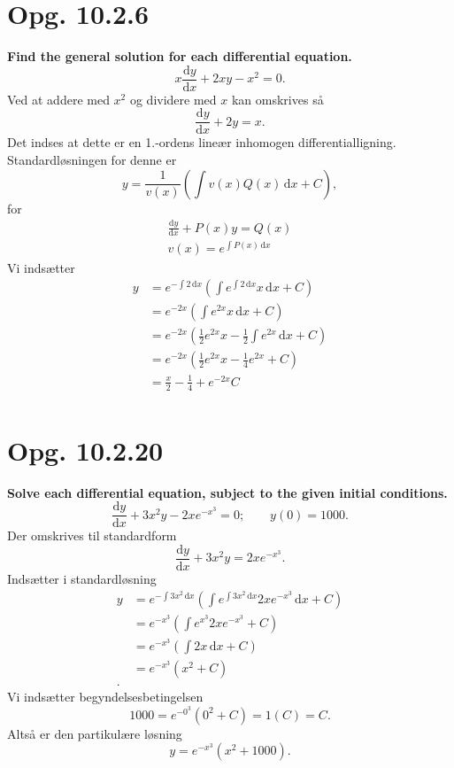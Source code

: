 \documentclass[12pt]{article}
\begin{document}
\section*{Opg. 10.2.6}
\textbf{Find the general solution for each differential equation.}
\[
x \frac{\mathrm{d}y}{\mathrm{d}x} + 2xy - x^2 = 0
.\] 
\bigbreak
Ved at addere med $x^2$ og dividere med $x$ kan omskrives så
\[
\frac{\mathrm{d}y}{\mathrm{d}x} + 2y  = x
.\] 
Det indses at dette er en 1.-ordens lineær inhomogen differentialligning. Standardløsningen for denne er
\[
  y = \frac{1}{v(x)}\left( \int v(x)Q(x) \, \mathrm{d}x + C  \right) 
,\]
for
\begin{gather*}
  \frac{\mathrm{d}y}{\mathrm{d}x} + P(x)y = Q(x) \\
v(x) = e^{\int P(x) \, \mathrm{d}x}
\end{gather*}
Vi indsætter
\begin{align*}
  y &= e^{-\int 2 \, \mathrm{d}x}\left( \int e^{\int 2 \, \mathrm{d}x}x \, \mathrm{d}x + C \right) \\
  &= e^{-2x}\left( \int e^{2x}x \, \mathrm{d}x + C \right)  \\
  &= e^{-2x} \left( \frac{1}{2}e^{2x}x - \frac{1}{2} \int e^{2x} \, \mathrm{d}x + C \right)   \\
  &= e^{-2x}\left( \frac{1}{2}e^{2x}x - \frac{1}{4}e^{2x} + C \right)  \\
  &= \frac{x}{2} - \frac{1}{4} + e^{-2x}C  \\
\end{align*}


\section*{Opg. 10.2.20}
\textbf{Solve each differential equation, subject to the given initial conditions.}
\[
\frac{\mathrm{d}y}{\mathrm{d}x} + 3x^2y - 2xe^{-x^3} = 0; \qquad y(0) = \num{1000}
.\]
\bigbreak
Der omskrives til standardform
\[
\frac{\mathrm{d}y}{\mathrm{d}x} + 3x^2y = 2xe^{-x^3}
.\] 
Indsætter i standardløsning
\begin{align*}
  y &= e^{-\int 3x^2 \, \mathrm{d}x}\left( \int e^{\int 3x^2 \, \mathrm{d}x} 2xe^{-x^3} \, \mathrm{d}x + C \right)  \\
  &= e^{-x^3}\left( \int e^{x^3}2xe^{-x^3} + C \right)  \\
  &= e^{-x^3}\left( \int 2x \, \mathrm{d}x + C \right)  \\
  &= e^{-x^3}\left( x^2 + C \right)  \\
.\end{align*}
Vi indsætter begyndelsesbetingelsen
\[
1000 = e^{-0^3}\left( 0^2 + C \right) = 1\left( C \right) = C
.\] 
Altså er den partikulære løsning
\[
y = e^{-x^3}\left( x^2 + 1000 \right) 
.\] 
\end{document}
